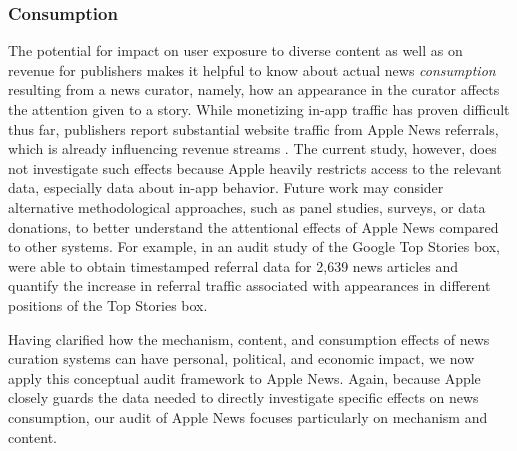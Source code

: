 \subsubsection{Consumption}
The potential for impact on user exposure to diverse content as well as on revenue for publishers makes it helpful to know about actual news \textit{consumption} resulting from a news curator, namely, how an appearance in the curator affects the attention given to a story. While monetizing in-app traffic has proven difficult thus far, publishers report substantial website traffic from Apple News referrals, which is already influencing revenue streams \citep{Nicas2018,Oremus2018,Tran,Dotan2018,Weiss}.  The current study, however, does not investigate such effects because Apple heavily restricts access to the relevant data, especially data about in-app behavior. Future work may consider alternative methodological approaches, such as panel studies, surveys, or data donations, to better understand the attentional effects of Apple News compared to other systems. For example, in an audit study of the Google Top Stories box, \cite{Trielli} were able to obtain timestamped referral data for 2,639 news articles and quantify the increase in referral traffic associated with appearances in different positions of the Top Stories box.

Having clarified how the mechanism, content, and consumption effects of news curation systems can have personal, political, and economic impact, we now apply this conceptual audit framework to Apple News. Again, because Apple closely guards the data needed to directly investigate specific effects on news consumption, our audit of Apple News focuses particularly on mechanism and content. 